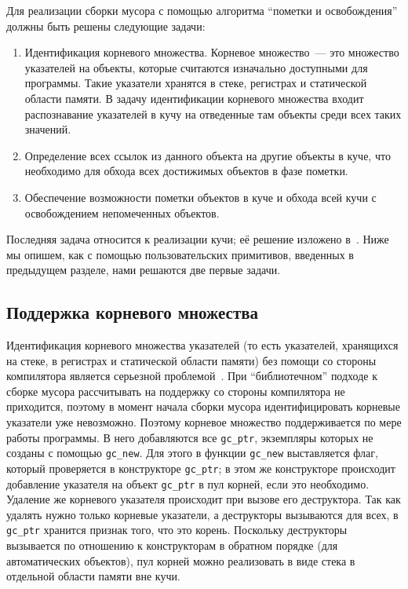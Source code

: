 Для реализации сборки мусора с помощью алгоритма ``пометки и освобождения'' должны быть решены
следующие задачи:

\begin{enumerate}
\item Идентификация корневого множества. Корневое множество~--- это множество указателей на
объекты, которые считаются изначально доступными для программы. Такие указатели хранятся в
стеке, регистрах и статической области памяти. В задачу идентификации корневого множества 
входит распознавание указателей в кучу на отведенные там объекты среди всех таких значений.

\item Определение всех ссылок из данного объекта на другие объекты в куче, что необходимо для
обхода всех достижимых объектов в фазе пометки.

\item Обеспечение возможности пометки объектов в куче и обхода всей кучи с освобождением 
непомеченных объектов.
\end{enumerate}

Последняя задача относится к реализации кучи; её решение изложено в~\cite{realisation}. Ниже 
мы опишем, как с помощью пользовательских примитивов, введенных в предыдущем разделе,
нами решаются две первые задачи.

\subsection{Поддержка корневого множества}

Идентификация корневого множества указателей (то есть указателей, хранящихся на стеке, в регистрах и статической
области памяти) без помощи со стороны компилятора является серьезной проблемой~\cite{roots}. При ``библиотечном''
подходе к сборке мусора рассчитывать на поддержку со стороны компилятора не приходится, поэтому в момент
начала сборки мусора идентифицировать корневые указатели уже невозможно. Поэтому корневое множество
поддерживается по мере работы программы. В него добавляются все \lstinline{gc_ptr}, экземпляры которых
не созданы с помощью \lstinline{gc_new}. Для этого в функции \lstinline{gc_new} выставляется флаг,
который проверяется в конструкторе \lstinline{gc_ptr}; в этом же конструкторе происходит добавление
указателя на объект \lstinline{gc_ptr} в пул корней, если это необходимо. Удаление же корневого
указателя происходит при вызове его деструктора. Так как удалять нужно только корневые указатели, а деструкторы
вызываются для всех, в \lstinline{gc_ptr} хранится признак того, что это корень. Поскольку деструкторы 
вызывается по отношению к конструкторам в обратном порядке (для автоматических объектов), пул корней можно 
реализовать в виде стека в отдельной области памяти вне кучи. 

